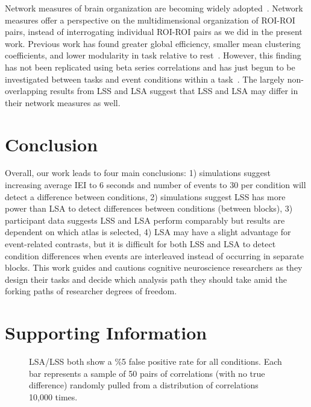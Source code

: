 \documentclass[phd,appendix,figures]{uithesis}
\begin{document}
Network measures of brain organization are becoming widely adopted~\cite{Rubinov2010}.
Network measures offer a perspective on the multidimensional organization of ROI-ROI pairs, instead of
interrogating individual ROI-ROI pairs as we did in the present work.
Previous work has found greater global efficiency, smaller mean clustering coefficients, and lower modularity in
task relative to rest~\cite{Di2013}.
However, this finding has not been replicated using beta series correlations and has just begun
to be investigated between tasks and event conditions within a task~\cite{Di2019a}.
The largely non-overlapping results from LSS and LSA suggest that LSS and LSA may differ
in their network measures as well.

\section{Conclusion}

Overall, our work leads to four main conclusions:
1) simulations suggest increasing average IEI to 6 seconds and number of events to 30 per condition will detect a difference between conditions, 
2) simulations suggest LSS has more power than LSA to detect differences between conditions (between blocks),
3) participant data suggests LSS and LSA perform comparably but results are dependent on which atlas is selected,
4) LSA may have a slight advantage for event-related contrasts,
but it is difficult for both LSS and LSA to detect condition differences when events are interleaved instead of occurring in separate blocks.
This work guides and cautions cognitive neuroscience researchers as they design their tasks and decide
which analysis path they should take amid the forking paths of researcher degrees of freedom.

\section{Supporting Information}

\begin{figure}[H]
  \centering


  \caption[Simulations of false positive rate for LSS/LSA]{
    LSA/LSS both show a \%5 false positive rate for all conditions.
    Each bar represents a sample of 50 pairs of correlations (with no true difference)
    randomly pulled from a distribution of correlations 10,000 times.
  }
  \label{fig:res_sim_fpr}
\end{figure}
\end{document}
